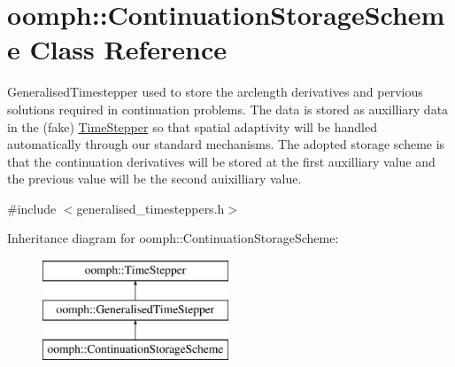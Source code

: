 \hypertarget{classoomph_1_1ContinuationStorageScheme}{}\section{oomph\+:\+:Continuation\+Storage\+Scheme Class Reference}
\label{classoomph_1_1ContinuationStorageScheme}


Generalised\+Timestepper used to store the arclength derivatives and pervious solutions required in continuation problems. The data is stored as auxilliary data in the (fake) \hyperlink{classoomph_1_1TimeStepper}{Time\+Stepper} so that spatial adaptivity will be handled automatically through our standard mechanisms. The adopted storage scheme is that the continuation derivatives will be stored at the first auxilliary value and the previous value will be the second auixilliary value.  




{\ttfamily \#include $<$generalised\+\_\+timesteppers.\+h$>$}

Inheritance diagram for oomph\+:\+:Continuation\+Storage\+Scheme\+:\begin{figure}[H]
\begin{center}
\leavevmode
\includegraphics[height=3.000000cm]{classoomph_1_1ContinuationStorageScheme}
\end{center}
\end{figure}
